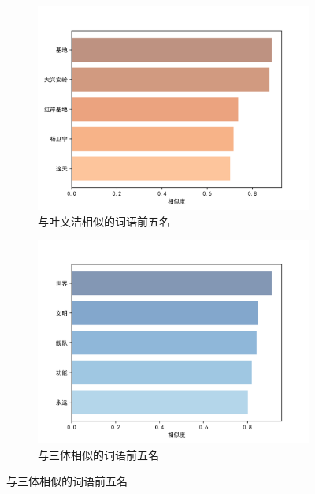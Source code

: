 \documentclass[12pt]{xjtureport}
\begin{document}
\begin{figure}[t]
    \centering
    \begin{subfigure}[b]{0.4\textwidth}
        \centering
        \includegraphics[width=\linewidth]{figures/叶文洁词袋模型.png}
        \caption{与叶文洁相似的词语前五名}
        \label{yewenjie}
        \end{subfigure}
    \hspace{0.05\textwidth} 
    \begin{subfigure}[b]{0.4\textwidth}
        \centering
        \includegraphics[width=\textwidth]{figures/三体词袋模型.png}
        \caption{与三体相似的词语前五名}
        \label{santi}
    \end{subfigure}
    \label{combine1}
  \end{figure}
\end{document}
